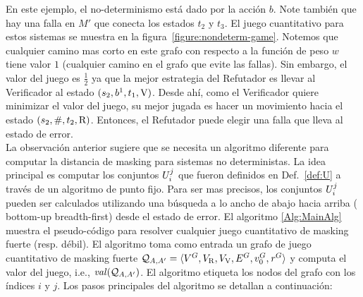 En este ejemplo, el no-determinismo está dado por la acción $b$. Note también que hay una falla en $M'$ que conecta los estados $t_2$ y $t_3$. El juego cuantitativo para estos sistemas se muestra en la figura~\ref{figure:nondeterm-game}. Notemos que cualquier camino mas corto en este grafo con respecto a la función de peso $w$ tiene valor $1$ (cualquier camino en el grafo que evite las fallas). Sin embargo, el valor del juego es $\frac{1}{2}$ ya que la mejor estrategia del Refutador es llevar al Verificador al estado $(s_2,b^1,t_1,\mathrm{V})$. 
Desde ahí, como el Verificador quiere minimizar el valor del juego, su mejor jugada es hacer un movimiento hacia el estado $(s_2,\#,t_2,\mathrm{R})$. Entonces, el Refutador puede elegir una falla que lleva al estado de error. \\

La observación anterior sugiere que se necesita un algoritmo diferente para computar la distancia de masking para sistemas no deterministas. 
La idea principal es computar los conjuntos $U^j_i$ que fueron definidos en Def.~\ref{def:U} a través de un algoritmo de punto fijo. Para ser mas precisos, los conjuntos $U^j_i$ pueden ser calculados utilizando una búsqueda a lo ancho de abajo hacia arriba ( 
bottom-up breadth-first) desde el estado de error. 
El algoritmo \ref{Alg:MainAlg} muestra el pseudo-código para resolver cualquier juego cuantitativo de masking fuerte (resp. débil). 
El algoritmo toma como entrada un grafo de juego cuantitativo de masking fuerte  $\mathcal{Q}_{A, A'} = \langle V^G, V_{\mathrm{R}}, V_{\mathrm{V}},E^G, v_0^G, \mathit{r}^G \rangle$ 
y computa el valor del juego, i.e., $\mathit{val}(\mathcal{Q}_{A, A'})$.
El algoritmo etiqueta los nodos del grafo con los índices $i$ y $j$. 
Los pasos principales del algoritmo se detallan a continuación:


